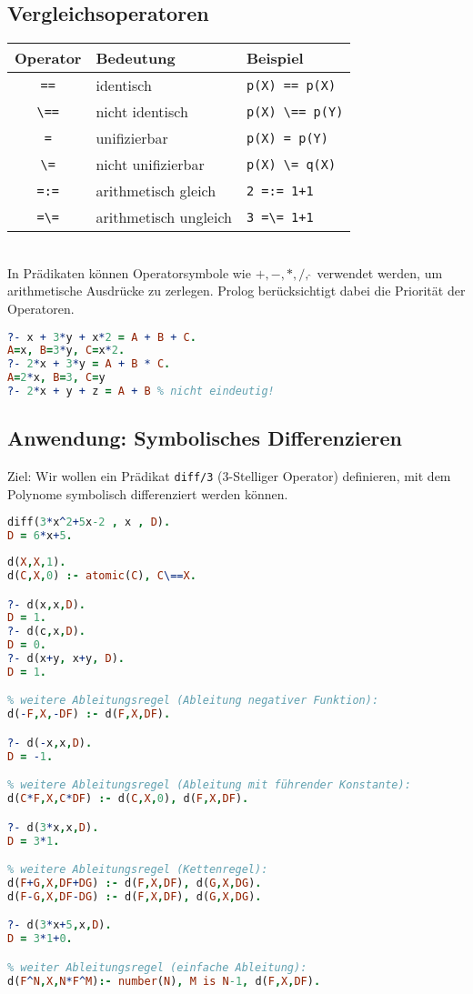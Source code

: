 \subsection{Vergleichsoperatoren}
\begin{tabular}{c l l}
Operator & Bedeutung & Beispiel\\\hline
\lstinline$==$ & identisch & \lstinline$p(X) == p(X)$\\
\lstinline$\==$ & nicht identisch & \lstinline$p(X) \== p(Y)$\\
\lstinline$=$ & unifizierbar & \lstinline$p(X) = p(Y)$\\
\lstinline$\=$ & nicht unifizierbar & \lstinline$p(X) \= q(X)$\\
\lstinline$=:=$ & arithmetisch gleich & \lstinline$2 =:= 1+1$\\
\lstinline$=\=$ & arithmetisch ungleich & \lstinline$3 =\= 1+1$
\end{tabular}\\
In Prädikaten können Operatorsymbole wie $+, -, *, /, \hat{\,}$ verwendet werden, um arithmetische Ausdrücke zu zerlegen. Prolog berücksichtigt dabei die Priorität der Operatoren.
$ $
\begin{lstlisting}[language=Prolog]
?- x + 3*y + x*2 = A + B + C.
A=x, B=3*y, C=x*2.
?- 2*x + 3*y = A + B * C.
A=2*x, B=3, C=y
?- 2*x + y + z = A + B % nicht eindeutig!
\end{lstlisting}

\subsection{Anwendung: Symbolisches Differenzieren}
Ziel: Wir wollen ein Prädikat \lstinline$diff/3$ (3-Stelliger Operator) definieren, mit dem Polynome symbolisch differenziert werden können.
 $ $
\begin{lstlisting}[language=Prolog]
diff(3*x^2+5x-2 , x , D).
D = 6*x+5.
\end{lstlisting}
\begin{lstlisting}[language=Prolog]
d(X,X,1).
d(C,X,0) :- atomic(C), C\==X.

?- d(x,x,D).
D = 1.
?- d(c,x,D).
D = 0.
?- d(x+y, x+y, D).
D = 1.

% weitere Ableitungsregel (Ableitung negativer Funktion):
d(-F,X,-DF) :- d(F,X,DF).

?- d(-x,x,D).
D = -1.

% weitere Ableitungsregel (Ableitung mit führender Konstante):
d(C*F,X,C*DF) :- d(C,X,0), d(F,X,DF).

?- d(3*x,x,D).
D = 3*1.

% weitere Ableitungsregel (Kettenregel):
d(F+G,X,DF+DG) :- d(F,X,DF), d(G,X,DG).
d(F-G,X,DF-DG) :- d(F,X,DF), d(G,X,DG).

?- d(3*x+5,x,D).
D = 3*1+0.

% weiter Ableitungsregel (einfache Ableitung): 
d(F^N,X,N*F^M):- number(N), M is N-1, d(F,X,DF).
\end{lstlisting}

